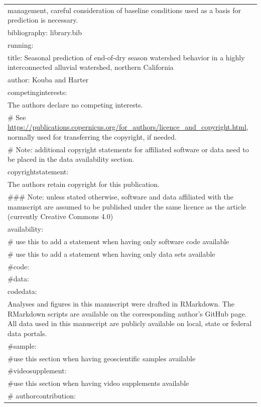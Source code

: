 \documentclass[
]{article}
\begin{document}
\begin{longtable}[]{@{}l@{}}
management, careful consideration of baseline conditions used as a basis
for prediction is necessary. \\
bibliography: library.bib \\
running: \\
title: Seasonal prediction of end-of-dry season watershed behavior in a
highly interconnected alluvial watershed, northern California \\
author: Kouba and Harter \\
competinginterests: \textbar{} \\
The authors declare no competing interests. \\
\# See
\url{https://publications.copernicus.org/for_authors/licence_and_copyright.html},
normally used for transferring the copyright, if needed. \\
\# Note: additional copyright statements for affiliated software or data
need to be placed in the data availability section. \\
copyrightstatement: \textbar{} \\
The authors retain copyright for this publication. \\
\#\#\# Note: unless stated otherwise, software and data affiliated with
the manuscript are assumed to be published under the same licence as the
article (currently Creative Commons 4.0) \\
availability: \\
\# use this to add a statement when having only software code
available \\
\# use this to add a statement when having only data sets available \\
\#code: \textbar{} \\
\#data: \textbar{} \\
codedata: \textbar{} \\
Analyses and figures in this manuscript were drafted in RMarkdown. The
RMarkdown scripts are available on the corresponding author's GitHub
page. All data used in this manuscript are publicly available on local,
state or federal data portals. \\
\#sample: \textbar{} \\
\#use this section when having geoscientific samples available \\
\#videosupplement: \textbar{} \\
\#use this section when having video supplements available \\
\# authorcontribution: \textbar{} \\

\end{longtable}
\end{document}

